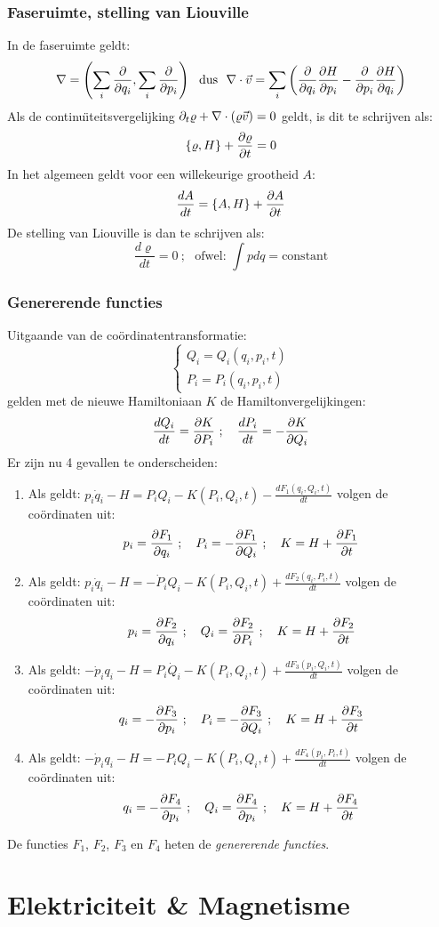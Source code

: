 \subsection{Faseruimte, stelling van Liouville}
In de faseruimte geldt:
\[
\nabla=\left(\sum_i\frac{\partial }{\partial q_i},\sum_i\frac{\partial }{\partial p_i}\right)\mbox{~~dus~~}
\nabla\cdot\vec{v}=\sum_i\left(\frac{\partial }{\partial q_i}\frac{\partial H}{\partial p_i}-\frac{\partial }{\partial p_i}\frac{\partial H}{\partial q_i}\right)
\]
Als de continu\"{\i}teitsvergelijking $\partial_t\varrho+\nabla\cdot(\varrho\vec{v})=0$ geldt,
is dit te schrijven als:
\[
\{\varrho,H\}+\frac{\partial \varrho}{\partial t}=0
\]
In het algemeen geldt voor een willekeurige grootheid $A$:
\[
\frac{dA}{dt}=\{A,H\}+\frac{\partial A}{\partial t}
\]
De stelling van Liouville is dan te schrijven als:
\[
\frac{d\varrho}{dt}=0~;~~~\mbox{ofwel:~}\int pdq=\mbox{constant}
\]
\subsection{Genererende functies}
Uitgaande van de co\"ordinatentransformatie:
\[
\left\{\begin{array}{l}
Q_i=Q_i(q_i,p_i,t)\\
P_i=P_i(q_i,p_i,t)
\end{array}\right.
\]
gelden met de nieuwe Hamiltoniaan $K$ de Hamiltonvergelijkingen:
\[
\frac{dQ_i}{dt}=\frac{\partial K}{\partial P_i}~;~~~\frac{dP_i}{dt}=-\frac{\partial K}{\partial Q_i}
\]
Er zijn nu 4 gevallen te onderscheiden:
\begin{enumerate}
\item Als geldt: $\displaystyle p_i\dot{q}_i-H=P_iQ_i-K(P_i,Q_i,t)-\frac{dF_1(q_i,Q_i,t)}{dt}$
volgen de co\"ordinaten uit:
\[
p_i=\frac{\partial F_1}{\partial q_i}~;~~~P_i=-\frac{\partial F_1}{\partial Q_i}~;~~~K=H+\frac{\partial F_1}{\partial t}
\]
\item Als geldt: $\displaystyle p_i\dot{q}_i-H=-\dot{P}_iQ_i-K(P_i,Q_i,t)+\frac{dF_2(q_i,P_i,t)}{dt}$
volgen de co\"ordinaten uit:
\[
p_i=\frac{\partial F_2}{\partial q_i}~;~~~Q_i=\frac{\partial F_2}{\partial P_i}~;~~~K=H+\frac{\partial F_2}{\partial t}
\]
\item Als geldt: $\displaystyle-\dot{p}_iq_i-H=P_i\dot{Q}_i-K(P_i,Q_i,t)+\frac{dF_3(p_i,Q_i,t)}{dt}$
volgen de co\"ordinaten uit:
\[
q_i=-\frac{\partial F_3}{\partial p_i}~;~~~P_i=-\frac{\partial F_3}{\partial Q_i}~;~~~K=H+\frac{\partial F_3}{\partial t}
\]
\item Als geldt: $\displaystyle-\dot{p}_iq_i-H=-P_iQ_i-K(P_i,Q_i,t)+\frac{dF_4(p_i,P_i,t)}{dt}$
volgen de co\"ordinaten uit:
\[
q_i=-\frac{\partial F_4}{\partial p_i}~;~~~Q_i=\frac{\partial F_4}{\partial p_i}~;~~~K=H+\frac{\partial F_4}{\partial t}
\]
\end{enumerate}
De functies $F_1$, $F_2$, $F_3$ en $F_4$ heten de {\it genererende functies}.

\chapter{Elektriciteit \& Magnetisme}
